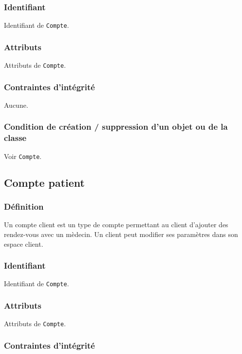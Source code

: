 \documentclass[a4paper, 11pt]{report}
\begin{document}
\subsubsection{Identifiant}

Identifiant de \texttt{Compte}.

\subsubsection{Attributs}

Attributs de \texttt{Compte}.

\subsubsection{Contraintes d'intégrité}

Aucune.

\subsubsection{Condition de création / suppression d'un objet ou de la classe}

Voir \texttt{Compte}.

\subsection{Compte patient}

\subsubsection{Définition}

Un compte client est un type de compte permettant au client d'ajouter des rendez-vous avec un mèdecin.
Un client peut modifier ses paramètres dans son espace client.

\subsubsection{Identifiant}

Identifiant de \texttt{Compte}.

\subsubsection{Attributs}

Attributs de \texttt{Compte}.

\subsubsection{Contraintes d'intégrité}
\end{document}

